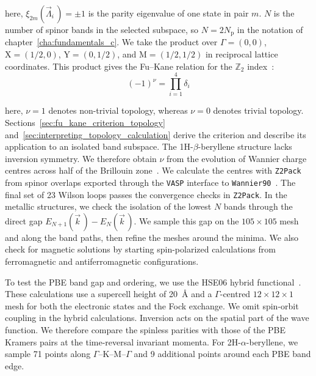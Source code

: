 here, $\xi_{2m}(\vec{\Lambda}_i\,)=\pm1$ is the parity eigenvalue of one state in pair $m$.
$N$ is the number of spinor bands in the selected subspace, so $N=2N_\mathrm{p}$ in the notation of chapter~\ref{cha:fundamentals_c}.
We take the product over $\Gamma=(0,0)$, $\mathrm{X}=(1/2,0)$, $\mathrm{Y}=(0,1/2)$, and $\mathrm{M}=(1/2,1/2)$ in reciprocal lattice coordinates.
This product gives the Fu--Kane relation for the $\mathbb{Z}_2$ index~\cite{fu2007topological,fu2007topological3d}:
\begin{equation}
    (-1)^{\nu} =
    \prod_{i=1}^{4} \delta_i
\label{eq:proj3_z2_index}
\end{equation}

here, $\nu=1$ denotes non-trivial topology, whereas $\nu=0$ denotes trivial topology.
Sections~\ref{sec:fu_kane_criterion_topology} and~\ref{sec:interpreting_topology_calculation} derive the criterion and describe its application to an isolated band subspace.
The 1H-$\beta$-beryllene structure lacks inversion symmetry.
We therefore obtain $\nu$ from the evolution of Wannier charge centres across half of the Brillouin zone~\cite{soluyanov2011computing,gresch2017z2pack}.
We calculate the centres with \texttt{Z2Pack} from spinor overlaps exported through the \texttt{VASP} interface to \texttt{Wannier90}~\cite{pizzi2020wannier90}.
The final set of 23 Wilson loops passes the convergence checks in \texttt{Z2Pack}.
In the metallic structures, we check the isolation of the lowest $N$ bands through the direct gap $E_{N+1}(\vec{k}\,)-E_N(\vec{k}\,)$.
We sample this gap on the $105 \times 105$ mesh and along the band paths, then refine the meshes around the minima.
We also check for magnetic solutions by starting spin-polarized calculations from ferromagnetic and antiferromagnetic configurations.

To test the PBE band gap and ordering, we use the HSE06 hybrid functional~\cite{heyd2003hybrid,krukau2006influence}.
These calculations use a supercell height of \qty{20}{\angstrom} and a $\Gamma$-centred $12 \times 12 \times 1$ mesh for both the electronic states and the Fock exchange.
We omit spin-orbit coupling in the hybrid calculations.
Inversion acts on the spatial part of the wave function.
We therefore compare the spinless parities with those of the PBE Kramers pairs at the time-reversal invariant momenta.
For 2H-$\alpha$-beryllene, we sample 71 points along $\Gamma$--$\mathrm{K}$--$\mathrm{M}$--$\Gamma$ and 9 additional points around each PBE band edge.

